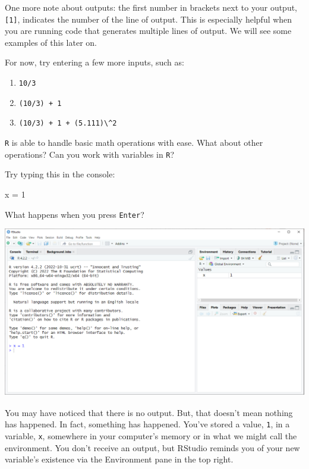 \documentclass[
]{book}
\newenvironment{Shaded}{\begin{snugshade}}{\end{snugshade}}
\newcommand{\DecValTok}[1]{\textcolor[rgb]{0.00,0.00,0.81}{#1}}
\newcommand{\NormalTok}[1]{#1}
\newcommand{\OtherTok}[1]{\textcolor[rgb]{0.56,0.35,0.01}{#1}}
\begin{document}
One more note about outputs: the first number in brackets next to your output, \texttt{{[}1{]}}, indicates the number of the line of output. This is especially helpful when you are running code that generates multiple lines of output. We will see some examples of this later on.

For now, try entering a few more inputs, such as:

\begin{enumerate}
\def\labelenumi{\arabic{enumi}.}
\item
  \texttt{10/3}
\item
  \texttt{(10/3)\ +\ 1}
\item
  \texttt{(10/3)\ +\ 1\ +\ (5.111)\textbackslash{}\^{}2}
\end{enumerate}

\texttt{R} is able to handle basic math operations with ease. What about other operations? Can you work with variables in \texttt{R}?

Try typing this in the console:

\begin{Shaded}
\begin{Highlighting}[]
\NormalTok{x }\OtherTok{=} \DecValTok{1}
\end{Highlighting}
\end{Shaded}

What happens when you press \texttt{Enter}?

\includegraphics{docs/_main_files/figure-html/RStudio console_x1.png}

You may have noticed that there is no output. But, that doesn't mean nothing has happened. In fact, something has happened. You've stored a value, \texttt{1}, in a variable, \texttt{x}, somewhere in your computer's memory or in what we might call the environment. You don't receive an output, but RStudio reminds you of your new variable's existence via the Environment pane in the top right.
\end{document}
